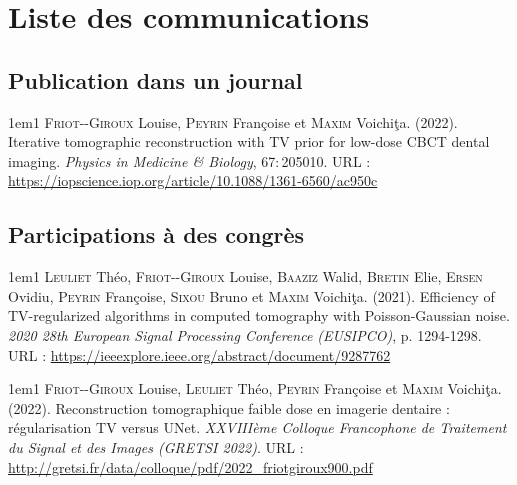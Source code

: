 \chapter*{Liste des communications}

\vfill

\section*{Publication dans un journal}

\begin{hangparas}{1em}{1}
\textsc{Friot-{}-Giroux} Louise, \textsc{Peyrin} Françoise et \textsc{Maxim} Voichi\c {t}a. (2022). Iterative tomographic reconstruction with TV prior for low-dose CBCT dental imaging. \textit{Physics in Medicine \& Biology}, 67\!:\,205010. URL : \url{https://iopscience.iop.org/article/10.1088/1361-6560/ac950c}
\end{hangparas}
\vspace{1em}

\vfill

\section*{Participations à des congrès}

\begin{hangparas}{1em}{1}
\textsc{Leuliet} Théo, \textsc{Friot-{}-Giroux} Louise, \textsc{Baaziz} Walid, \textsc{Bretin} Elie, \textsc{Ersen} Ovidiu, \textsc{Peyrin} Françoise, \textsc{Sixou} Bruno et \textsc{Maxim} Voichi\c {t}a. (2021). Efficiency of TV-regularized algorithms in computed tomography with Poisson-Gaussian noise. \textit{2020 28th European Signal Processing Conference (EUSIPCO)}, p. 1294-1298. URL : \url{https://ieeexplore.ieee.org/abstract/document/9287762}
\end{hangparas}
\vspace{0.5em}

\begin{hangparas}{1em}{1}
\textsc{Friot-{}-Giroux} Louise, \textsc{Leuliet} Théo, \textsc{Peyrin} Françoise et \textsc{Maxim} Voichi\c {t}a. (2022). Reconstruction tomographique faible dose en imagerie dentaire : régularisation TV versus UNet. \textit{XXVIIIème Colloque Francophone de Traitement du Signal et des Images (GRETSI 2022)}. URL : \url{http://gretsi.fr/data/colloque/pdf/2022_friotgiroux900.pdf}
\end{hangparas}
\vspace{1em}

